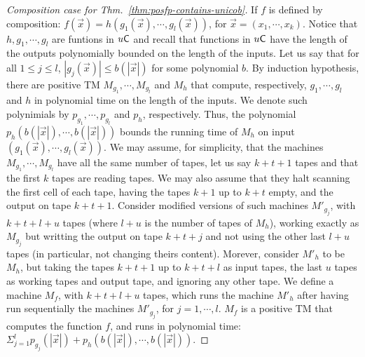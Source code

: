 \documentclass{lmcs}
\begin{document}
\begin{proof}
	[Composition case for Thm.~\ref{thm:posfp-contains-unicob}]
	
	If $f$ is defined by composition: $f(\vec x )=h(g_1 (\vec x ),\cdots ,g_l (\vec x ))$, for $\vec x =(x_1 ,\cdots ,x_k )$. Notice that $h, g_1 ,\cdots ,g_l$ are funtions in $u \mathsf{C}$ and recall that functions in $u \mathsf{C}$ have the length of the outputs polynomially bounded on the length of the inputs. Let us say that for all $1\leq j\leq l$, $|g_j (\vec x )|\leq b(|\vec x |)$ for some polynomial $b$. By induction hypothesis, there are positive TM $M_{g_1} , \cdots , M_{g_l}$ and $M_{h}$ that compute, respectively, $g_1 , \cdots , g_l$ and $h$ in polynomial time on the length of the inputs. We denote such polynimials by $p_{g_1} , \cdots,p_{g_l}$ and $p_h$, respectively. Thus, the polynomial $p_h (b(|\vec x|), \cdots , b(|\vec x|))$ bounds the running time of $M_h$ on input $(g_1 (\vec x),\cdots ,g_l (\vec x ))$. We may assume, for simplicity, that the machines $M_{g_1}, \cdots ,M_{g_l}$ have all the same number of tapes, let us say $k+t+1$ tapes and that the first $k$ tapes are reading tapes. We may also assume that they halt scanning the first cell of each tape, having the tapes $k+1$ up to $k+t$ empty, and the output on tape $k+t+1$. Consider modified versions of such machines $M'_{g_j}$, with $k+t+l+u$ tapes (where $l+u$ is the number of tapes of $M_h$), working exactly as $M_{g_j}$ but writting the output on tape $k+t+j$ and not using the other last $l+u$ tapes (in particular, not changing theirs content). Morever, consider $M'_h$ to be $M_h$, but taking the tapes $k+t+1$ up to $k+t+l$ as input tapes, the last $u$ tapes as working tapes and output tape, and ignoring any other tape. We define a machine $M_f$, with $k+t+l+u$ tapes, which runs the machine $M'_h$ after having run sequentially the machines $M'_{g_j}$, for $j=1,\cdots ,l$. $M_f$ is a positive TM that computes the function $f$, and runs in polynomial time: $\Sigma_{j=1}^{l} p_{g_j}(|\vec x |)+ p_h (b(|\vec x|), \cdots , b(|\vec x|))$.
\end{proof}
\end{document}
